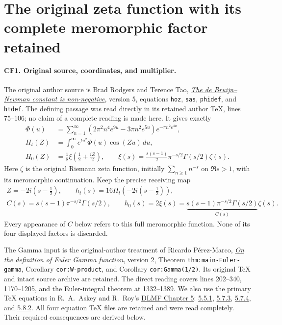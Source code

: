 \section{The original zeta function with its complete meromorphic factor retained}
\label{sec:completion-factor-full-heat-map}

\paragraph{CF1. Original source, coordinates, and multiplier.}
The original author source is Brad Rodgers and Terence Tao,
\href{https://arxiv.org/abs/1801.05914v5}{\emph{The de Bruijn--Newman
constant is non-negative}}, version 5, equations
\texttt{hoz}, \texttt{sas}, \texttt{phidef}, and \texttt{htdef}.
The defining passage was read directly in its retained author
TeX, lines 75--106; no claim of a complete reading is made here.
It gives exactly
\[
 \begin{split}
 \Phi(u)&=\sum_{n=1}^{\infty}
 (2\pi^2n^4e^{9u}-3\pi n^2e^{5u})e^{-\pi n^2e^{4u}},\\
 H_t(Z)&=\int_0^\infty e^{tu^2}\Phi(u)\cos(Zu)\,du,\\
 H_0(Z)&=\frac18\xi\!\left(\frac12+\frac{iZ}{2}\right),
 \qquad
 \xi(s)=\frac{s(s-1)}2\pi^{-s/2}\Gamma(s/2)\zeta(s).
 \end{split}\tag{CF1}
\]
Here \(\zeta\) is the original Riemann zeta function, initially
\(\sum_{n\ge1}n^{-s}\) on \(\Re s>1\), with its meromorphic
continuation. Keep the precise receiving map
\[
 \begin{gathered}
 Z=-2i(s-\tfrac12),\qquad
 h_t(s)=16H_t\!\left(-2i(s-\tfrac12)\right),\\
 C(s)=s(s-1)\pi^{-s/2}\Gamma(s/2),\qquad
 h_0(s)=2\xi(s)=
 \underbrace{s(s-1)\pi^{-s/2}\Gamma(s/2)}_{C(s)}\zeta(s).
 \end{gathered}\tag{CF2}
\]
Every appearance of \(C\) below refers to this full meromorphic
function. None of its four displayed factors is discarded.

The Gamma input is the original-author treatment of Ricardo
P\'erez-Marco,
\href{https://arxiv.org/abs/2001.04445v2}{\emph{On the definition
of Euler Gamma function}}, version 2, Theorem
\texttt{thm:main-Euler-gamma}, Corollary \texttt{cor:W-product},
and Corollary \texttt{cor:Gamma(1/2)}. Its original TeX
 and intact source archive
are retained. The direct reading covers lines 202--340,
1170--1205, and the Euler-integral theorem at 1332--1389.
We also use the primary TeX equations in R.\ A.\ Askey and
R.\ Roy's \href{https://dlmf.nist.gov/5}{DLMF Chapter 5}:
\href{https://dlmf.nist.gov/5.5.E1}{5.5.1},
\href{https://dlmf.nist.gov/5.7.E3}{5.7.3},
\href{https://dlmf.nist.gov/5.7.E4}{5.7.4}, and
\href{https://dlmf.nist.gov/5.8.E2}{5.8.2}.
All four equation TeX files are retained and were read completely.
Their required consequences are derived below.

